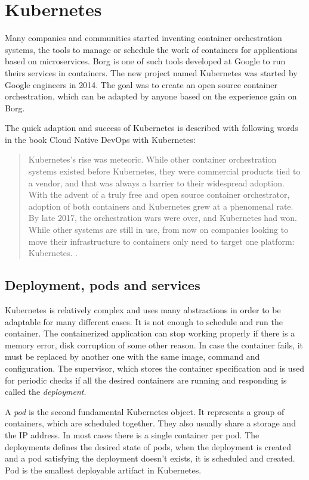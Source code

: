 \documentclass[
  digital, %
  twoside, %
  table,   %
  lof,     %
  lot,     %
]{fithesis3}
\begin{document}
\section{Kubernetes}
Many companies and communities started inventing container orchestration systems, the tools to manage or schedule the work of containers for applications based on microservices. Borg \cite{borg} is one of such tools developed at Google to run theirs services in containers. The new project named Kubernetes was started by Google engineers in 2014. The goal was to create an open source container orchestration, which can be adapted by anyone based on the experience gain on Borg.

The quick adaption and success of Kubernetes is described with following words in the book Cloud Native DevOps with Kubernetes:
\begin{quote}
Kubernetes’s rise was meteoric. While other container orchestration systems existed
before Kubernetes, they were commercial products tied to a vendor, and that was
always a barrier to their widespread adoption. With the advent of a truly free and
open source container orchestrator, adoption of both containers and Kubernetes grew
at a phenomenal rate.
By late 2017, the orchestration wars were over, and Kubernetes had won. While other
systems are still in use, from now on companies looking to move their infrastructure
to containers only need to target one platform: Kubernetes. \cite{k8s, p. 11}.
\end{quote}

\subsection{Deployment, pods and services}
Kubernetes is relatively complex and uses many abstractions in order to be adaptable for many different cases. It is not enough to schedule and run the container. The containerized application can stop working properly if there is a memory error, disk corruption of some other reason. In case the container fails, it must be replaced by another one with the same image, command and configuration. The supervisor, which stores the container specification and is used for periodic checks if all the desired containers are running and responding is called the \textit{deployment}.

A \textit{pod} is the second fundamental Kubernetes object. It represents a group of containers, which are scheduled together. They also usually share a storage and the IP address. In most cases there is a single container per pod. The deployments defines the desired state of pods, when the deployment is created and a pod satisfying the deployment doesn't exists, it is scheduled and created. Pod is the smallest deployable artifact in Kubernetes.
\end{document}
